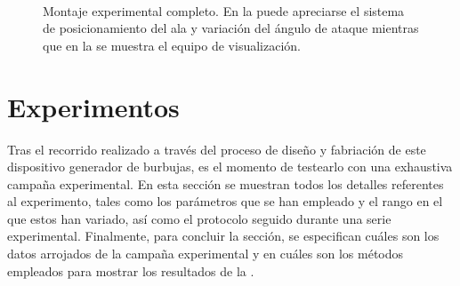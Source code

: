 \begin{figure}
\centering
{}\\
\caption{Montaje experimental completo. En la  puede apreciarse el sistema de posicionamiento del ala y variación del ángulo de ataque mientras que en la  se muestra el equipo de visualización.}
\end{figure}


\section{Experimentos}

Tras el recorrido realizado a través del proceso de diseño y fabriación de este dispositivo generador de burbujas, es el momento de testearlo con una exhaustiva campaña experimental. En esta sección se muestran todos los detalles referentes al experimento, tales como los parámetros que se han empleado y el rango en el que estos han variado, así como el protocolo seguido durante una serie experimental. Finalmente, para concluir la sección, se especifican cuáles son los datos arrojados de la campaña experimental y en cuáles son los métodos empleados para mostrar los resultados de la . 

